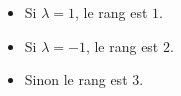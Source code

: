 \begin{itemize}
 \item Si $\lambda=1$, le rang est $1$.
\item Si $\lambda=-1$, le rang est $2$.
\item Sinon le rang est $3$.
\end{itemize}
